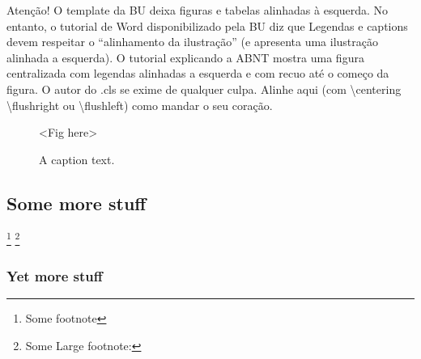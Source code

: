 \documentclass[english]{ufsc-thesis-rn46-2019}
\begin{document}
Atenção! O template da BU deixa figuras e tabelas alinhadas à esquerda. No entanto, o tutorial de Word disponibilizado pela BU diz que Legendas e captions devem respeitar o ``alinhamento da ilustração'' (e apresenta uma ilustração alinhada a esquerda). O tutorial explicando a ABNT mostra uma figura centralizada com legendas alinhadas a esquerda e com recuo até o começo da figura. O autor do .cls se exime de qualquer culpa. Alinhe aqui (com \textbackslash{}centering \textbackslash{}flushright ou \textbackslash{}flushleft) como mandar o seu coração.

\begin{figure}[tb]
  \centering
  \caption{\footnotesize A caption text.}
  \label{fig:f}

  <Fig here>
\end{figure}


\subsection{Some more stuff}
\label{sec:more}

\lipsum[1] \footnote{Some footnote}
\footnote{Some Large footnote: \lipsum[4]}

\subsubsection{Yet more stuff}
\label{sec:yet-more}

\lipsum[1]

\label{sec:yet-another}

\lipsum[1]

\postextual

\end{document}

